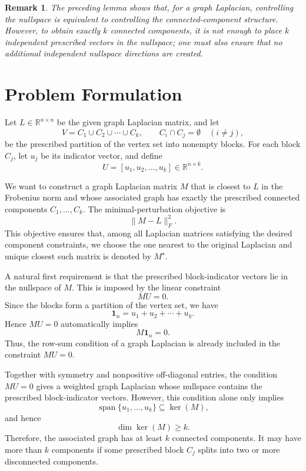 \documentclass[11pt]{article}
\newtheorem{remark}[theorem]{Remark}
\begin{document}
	\begin{remark}
		The preceding lemma shows that, for a graph Laplacian, controlling the nullspace is equivalent to controlling the connected-component structure. However, to obtain exactly $k$ connected components, it is not enough to place $k$ independent prescribed vectors in the nullspace; one must also ensure that no additional independent nullspace directions are created.
	\end{remark}

	\section{Problem Formulation}
	
	Let $L\in\mathbb R^{n\times n}$ be the given graph Laplacian matrix, and let
	\[
	V=C_1\cup C_2\cup\cdots\cup C_k,
	\qquad
	C_i\cap C_j=\emptyset\quad (i\ne j),
	\]
	be the prescribed partition of the vertex set into nonempty blocks. For each block
	$C_j$, let $u_j$ be its indicator vector, and define
	\[
	U=[u_1,u_2,\ldots,u_k]\in\mathbb R^{n\times k}.
	\]
	
	{We want to construct a graph Laplacian matrix $M$ that is closest to $L$ in the
	Frobenius norm and whose associated graph has exactly the prescribed connected
	components $C_1,\ldots,C_k$.} The minimal-perturbation objective is
	\[
	\|M-L\|_F^2.
	\]
	This objective ensures that, among all Laplacian matrices satisfying the desired
	component constraints, we choose the one nearest to the original Laplacian and unique closest such matrix is denoted by $M^\star$.
	
	A natural first requirement is that the prescribed block-indicator vectors lie in
	the nullspace of $M$. This is imposed by the linear constraint
	\[
	MU=0.
	\]
	Since the blocks form a partition of the vertex set, we have
	\[
	\mathbf 1_n=u_1+u_2+\cdots+u_k.
	\]
	Hence $MU=0$ automatically implies
	\[
	M\mathbf 1_n=0.
	\]
	Thus, the row-sum condition of a graph Laplacian is already included in the
	constraint $MU=0$.
	
	Together with symmetry and nonpositive off-diagonal entries, the condition
	$MU=0$ gives a weighted graph Laplacian whose nullspace contains the prescribed
	block-indicator vectors. However, this condition alone only implies
	\[
	\operatorname{span}\{u_1,\ldots,u_k\}\subseteq\ker(M),
	\]
	and hence
	\[
	\dim\ker(M)\ge k.
	\]
	Therefore, the associated graph has at least $k$ connected components. It may
	have more than $k$ components if some prescribed block $C_j$ splits into two or
	more disconnected components.
	
\end{document}

